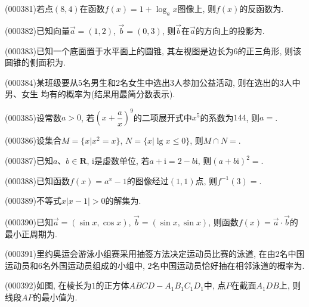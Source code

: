 \item (000381)若点$(8,4)$在函数$f(x)=1+\log_a x$图像上, 则$f(x)$的反函数为.
\item (000382)已知向量$\overrightarrow{a}=(1,2)$, $\overrightarrow{b}=(0,3)$, 则$\overrightarrow{b}$在$\overrightarrow{a}$的方向上的投影为.
\item (000383)已知一个底面置于水平面上的圆锥, 其左视图是边长为6的正三角形, 则该圆锥的侧面积为.
\item (000384)某班级要从$5$名男生和$2$名女生中选出$3$人参加公益活动, 则在选出的$3$人中男、女生
均有的概率为(结果用最简分数表示).
\item (000385)设常数$a>0$, 若$(x+\dfrac ax)^9$的二项展开式中$x^5$的系数为$144$, 则$a=$.
\item (000386)设集合$M=\{x|x^2=x\}$, $N=\{x|\lg x\le 0\}$, 则$M\cap N=$.
\item (000387)已知$a$、$b\in \mathbf{R}$, $\mathrm{i}$是虚数单位, 若$a+\mathrm{i}=2-b\mathrm{i}$, 则$(a+b\mathrm{i})^2=$.
\item (000388)已知函数$f(x)=a^x-1$的图像经过$(1,1)$点, 则$f^{-1}(3)=$.
\item (000389)不等式$x|x-1|>0$的解集为.
\item (000390)已知$\overrightarrow a=(\sin x,\cos x)$, $\overrightarrow b=(\sin x,\sin x)$, 则函数$f(x)=\overrightarrow a\cdot \overrightarrow b$的最小正周期为.
\item (000391)里约奥运会游泳小组赛采用抽签方法决定运动员比赛的泳道, 在由$2$名中国运动员和$6$名外国运动员组成的小组中, $2$名中国运动员恰好抽在相邻泳道的概率为.
\item (000392)如图, 在棱长为$1$的正方体$ABCD-A_1B_1C_1D_1$中, 点$P$在截面$A_1DB$上, 则线段$AP$的最小值为.
\begin{center}
\end{center}
